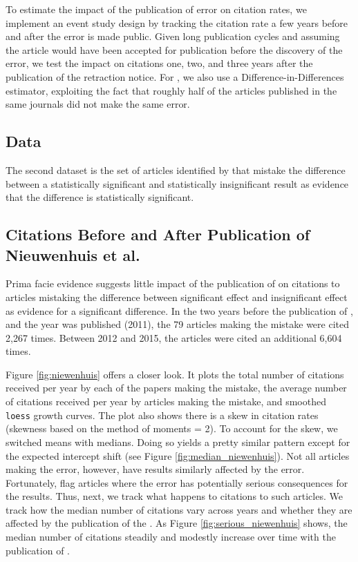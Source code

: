 To estimate the impact of the publication of error on citation rates, we implement an event study design by tracking the citation rate a few years before and after the error is made public. Given long publication cycles and assuming the article would have been accepted for publication before the discovery of the error, we test the impact on citations one, two, and three years after the publication of the retraction notice. For \citet{nieuwenhuis2011}, we also use a Difference-in-Differences estimator, exploiting the fact that roughly half of the articles published in the same journals did not make the same error. 

\subsection{Data}
The second dataset is the set of articles identified by \citet{nieuwenhuis2011} that mistake the difference between a statistically significant and statistically insignificant result as evidence that the difference is statistically significant.

\subsection{Citations Before and After Publication of Nieuwenhuis et al.}

Prima facie evidence suggests little impact of the publication of \citet{nieuwenhuis2011} on citations to articles mistaking the difference between significant effect and insignificant effect as evidence for a significant difference. In the two years before the publication of \citet{nieuwenhuis2011}, and the year \citet{nieuwenhuis2011} was published (2011), the 79 articles making the mistake were cited 2,267 times. Between 2012 and 2015, the articles were cited an additional 6,604 times.

Figure \ref{fig:niewenhuis} offers a closer look. It plots the total number of citations received per year by each of the papers making the mistake, the average number of citations received per year by articles making the mistake, and smoothed \texttt{loess} growth curves. The plot also shows there is a skew in citation rates (skewness based on the method of moments = 2). To account for the skew, we switched means with medians. Doing so yields a pretty similar pattern except for the expected intercept shift (see Figure \ref{fig:median_niewenhuis}). Not all articles making the error, however, have results similarly affected by the error. Fortunately, \citet{nieuwenhuis2011} flag articles where the error has potentially serious consequences for the results. Thus, next, we track what happens to citations to such articles. We track how the median number of citations vary across years and whether they are affected by the publication of the \citet{nieuwenhuis2011}. As Figure \ref{fig:serious_niewenhuis} shows, the median number of citations steadily and modestly increase over time with the publication of \citet{nieuwenhuis2011}.

